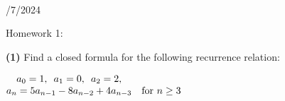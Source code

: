 \documentclass{book}
\newcommand{\hOne}{%
   \color{Black}%
   \fontsize{14}{16}\selectfont%
}
\newcommand{\blab}[1]{\textbf{#1}}
\newcommand{\myHS}{ \hspace{0.5em}}
\newcommand{\mySepTwo}[1][.]{%
   {\noindent\color{#1}{\rule{6.5in}{0.5mm}}}\\%
}
\newcommand{\retTwo}{\hfill\bigbreak}
\newcommand{\mHeader}[1]{{
   \color{Black}%
   \fontsize{20}{18}\selectfont%
   #1\retTwo
}}
\begin{document}
\mySepTwo

\hOne

\mHeader{10/7/2024}


\newpage

\hOne
\mHeader{Homework 1:}

\blab{(1)} Find a closed formula for the following recurrence relation:

{\centering 
$\begin{matrix}
   a_0 = 1,\myHS a_1 = 0,\myHS a_2 = 2,\\
   a_n = 5a_{n-1} - 8a_{n-2} + 4a_{n-3} & \text{for } n \geq 3
\end{matrix}$ \retTwo\par}
\end{document}
